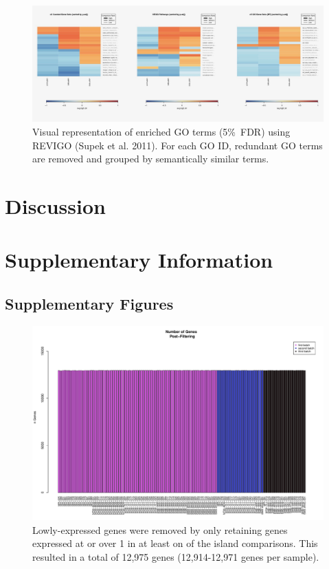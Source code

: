 \documentclass[12pt,a4paper,titlepage,twoside,openright]{book}
\begin{document}
\begin{mainmatter}
{{{\begin{figure}[htb!]
\centering
\includegraphics[width=\textwidth,height=\textheight,keepaspectratio]{Figures/allHeatmapSummary_GeneSets.jpg}
\caption{Visual representation of enriched GO terms (5\%\ FDR) using REVIGO (Supek et al. 2011).  For each GO ID, redundant GO terms are removed and grouped by semantically similar terms.}
\label{fig:Variance Explained}
\end{figure}

\chapter{Discussion}\label{}

\chapter{Supplementary Information}\label{}

\section{Supplementary Figures}

\begin{figure}[htb!]
\centering
\includegraphics[width=\textwidth,height=\textheight,keepaspectratio]{Figures/nGenes_indoRNA_postFiltering_123Combined.pdf}
\caption{Lowly-expressed genes were removed by only retaining genes expressed at or over 1 in at least on of the island comparisons. This resulted in a total of 12,975 genes (12,914-12,971 genes per sample).}
\label{fig:Total Genes Post Filtering}
\end{figure}


}}}
\end{mainmatter}
\end{document}
